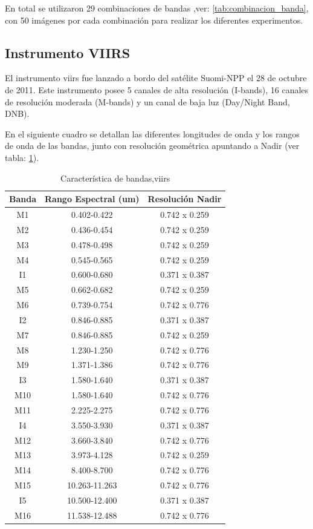 En total se utilizaron 29 combinaciones de bandas ,ver: \ref{tab:combinacion_banda}, con 50 imágenes por cada combinación para realizar los diferentes experimentos.



\subsection{Instrumento VIIRS}\label{sub:viirs}
El instrumento \ac{viirs} fue lanzado a bordo del satélite Suomi-NPP el 28 de octubre de 2011. Este instrumento posee 5 canales de alta resolución (I-bands), 16 canales de resolución moderada (M-bands) y un canal de baja luz (Day/Night Band, DNB). 

En el siguiente cuadro se detallan las diferentes longitudes de onda y los rangos de onda de las bandas, junto con resolución geométrica apuntando a Nadir (ver tabla: \ref{tab:viirs}).
\begin{table}[H]
\begin{center}
\begin{tabular}{|c|c|c|}
\hline Banda & Rango Espectral (um) & Resolución Nadir \\\hline 
 		M1  & 0.402-0.422   & 0.742 x 0.259 \\ \hline 
		M2  & 0.436-0.454   & 0.742 x 0.259 \\ \hline 
		M3  & 0.478-0.498   & 0.742 x 0.259 \\ \hline 
		M4  & 0.545-0.565   & 0.742 x 0.259 \\ \hline 
		I1  & 0.600-0.680   & 0.371 x 0.387 \\ \hline 
		M5  & 0.662-0.682   & 0.742 x 0.259 \\ \hline 
		M6  & 0.739-0.754   & 0.742 x 0.776 \\ \hline 
		I2  & 0.846-0.885   & 0.371 x 0.387 \\ \hline 
		M7  & 0.846-0.885   & 0.742 x 0.259 \\ \hline 
		M8  & 1.230-1.250   & 0.742 x 0.776 \\ \hline 
		M9  & 1.371-1.386   & 0.742 x 0.776 \\ \hline 
		I3  & 1.580-1.640   & 0.371 x 0.387 \\ \hline 
		M10 & 1.580-1.640   & 0.742 x 0.776 \\ \hline 
		M11 & 2.225-2.275   & 0.742 x 0.776 \\ \hline 
		I4  & 3.550-3.930   & 0.371 x 0.387 \\ \hline 
		M12 & 3.660-3.840   & 0.742 x 0.776 \\ \hline 
		M13 & 3.973-4.128   & 0.742 x 0.259 \\ \hline 
		M14 & 8.400-8.700   & 0.742 x 0.776 \\ \hline 
		M15 & 10.263-11.263 & 0.742 x 0.776 \\ \hline 
		I5  & 10.500-12.400 & 0.371 x 0.387 \\ \hline 
		M16 & 11.538-12.488 & 0.742 x 0.776 \\ \hline 
\end{tabular}
\end{center}\caption{Característica de bandas,\ac{viirs} \label{tab:viirs}}
\end{table}


